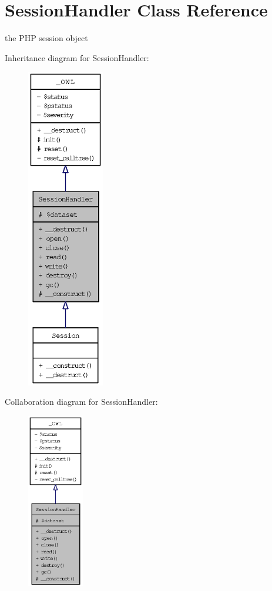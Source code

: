 \hypertarget{classSessionHandler}{
\section{SessionHandler Class Reference}
\label{classSessionHandler}
}
the PHP session object  


Inheritance diagram for SessionHandler:\nopagebreak
\begin{figure}[H]
\begin{center}
\leavevmode
\includegraphics[height=400pt]{classSessionHandler__inherit__graph}
\end{center}
\end{figure}
Collaboration diagram for SessionHandler:\nopagebreak
\begin{figure}[H]
\begin{center}
\leavevmode
\includegraphics[width=70pt]{classSessionHandler__coll__graph}
\end{center}
\end{figure}

